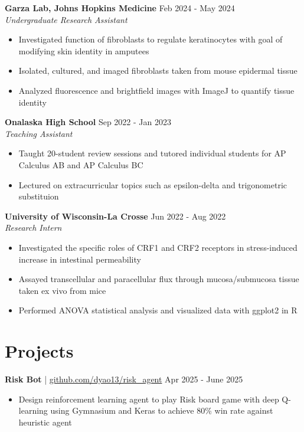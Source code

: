 \documentclass[11pt]{article}       %
\begin{document}
\textbf{Garza Lab, Johns Hopkins Medicine} \hfill Feb 2024 - May 2024 \\
\textit{Undergraduate Research Assistant} \vspace{-9pt} \\
\begin{itemize}
  \item Investigated function of fibroblasts to regulate keratinocytes with goal of modifying skin identity in amputees
  \item Isolated, cultured, and imaged fibroblasts taken from mouse epidermal tissue
  \item Analyzed fluorescence and brightfield images with ImageJ to quantify tissue identity
\end{itemize}

\textbf{Onalaska High School} \hfill Sep 2022 - Jan 2023 \\
\textit{Teaching Assistant} \vspace{-9pt} \\
\begin{itemize}
  \item Taught 20-student review sessions and tutored individual students for AP Calculus AB and AP Calculus BC
  \item Lectured on extracurricular topics such as epsilon-delta and trigonometric substituion
\end{itemize}

\textbf{University of Wisconsin-La Crosse} \hfill Jun 2022 - Aug 2022 \\
\textit{Research Intern} \vspace{-9pt} \\
\begin{itemize}
  \item Investigated the specific roles of CRF1 and CRF2 receptors in stress-induced increase in intestinal permeability
  \item Assayed transcellular and paracellular flux through mucosa/submucosa tissue taken ex vivo from mice
  \item Performed ANOVA statistical analysis and visualized data with ggplot2 in R
\end{itemize}

\vspace{-18.5pt}

\section*{Projects}
\textbf{Risk Bot} | \href{https://github.com/dyao13/risk_agent}{github.com/dyao13/risk\_agent} \hfill Apr 2025 - June 2025 \vspace{-9pt} \\
\begin{itemize}
  \item Design reinforcement learning agent to play Risk board game with deep Q-learning using Gymnasium and Keras to achieve 80\% win rate against heuristic agent
\end{itemize}
\end{document}
